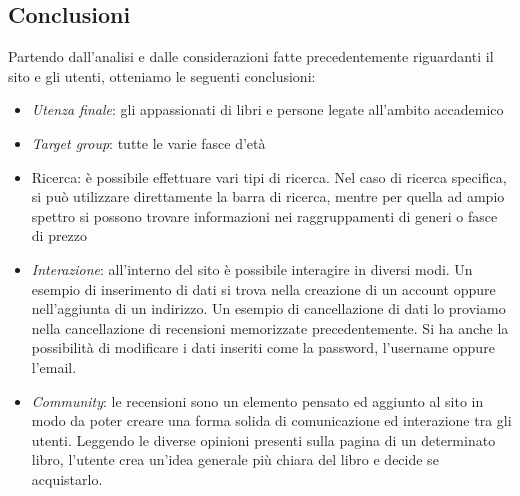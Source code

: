\subsection{Conclusioni}
Partendo dall’analisi e dalle considerazioni fatte precedentemente riguardanti il sito e gli utenti, otteniamo le seguenti conclusioni:
\begin{itemize}
	\item \textit{Utenza finale}: gli appassionati di libri e persone legate all'ambito 	accademico
	\item \textit{Target group}: tutte le varie fasce d’età
	\item Ricerca: è possibile effettuare vari tipi di ricerca. Nel caso di ricerca
			specifica, si può utilizzare direttamente la barra di ricerca, mentre per
			quella ad ampio spettro si possono trovare informazioni nei raggruppamenti di
			generi o fasce di prezzo
	\item \textit{Interazione}: all’interno del sito è possibile interagire in diversi
			modi. Un esempio di
			inserimento di dati si trova nella creazione di un account oppure 
			nell'aggiunta di un indirizzo. Un esempio di cancellazione di dati lo 
			proviamo nella cancellazione di recensioni memorizzate precedentemente.
			Si ha anche la possibilità di modificare i dati inseriti come la password,
			l’username oppure l’email.
	\item \textit{Community}: le recensioni sono un elemento pensato ed aggiunto al sito 	in modo da poter creare una forma solida di comunicazione ed interazione tra 	gli utenti. Leggendo le diverse opinioni presenti sulla pagina di un
			determinato libro, l’utente crea un'idea generale più chiara del libro e
			decide se acquistarlo.
\end{itemize}

